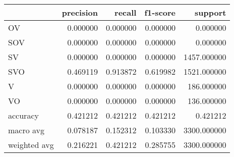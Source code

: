 \begin{tabular}{lrrrr}
\toprule
 & precision & recall & f1-score & support \\
\midrule
OV & 0.000000 & 0.000000 & 0.000000 & 0.000000 \\
SOV & 0.000000 & 0.000000 & 0.000000 & 0.000000 \\
SV & 0.000000 & 0.000000 & 0.000000 & 1457.000000 \\
SVO & 0.469119 & 0.913872 & 0.619982 & 1521.000000 \\
V & 0.000000 & 0.000000 & 0.000000 & 186.000000 \\
VO & 0.000000 & 0.000000 & 0.000000 & 136.000000 \\
accuracy & 0.421212 & 0.421212 & 0.421212 & 0.421212 \\
macro avg & 0.078187 & 0.152312 & 0.103330 & 3300.000000 \\
weighted avg & 0.216221 & 0.421212 & 0.285755 & 3300.000000 \\
\bottomrule
\end{tabular}
